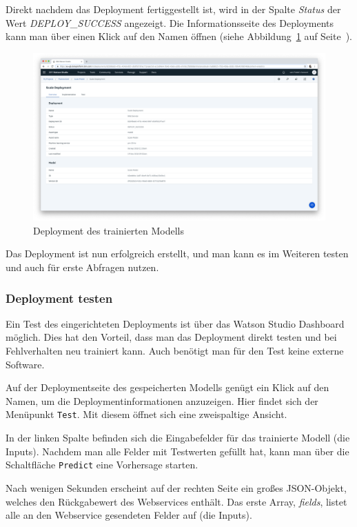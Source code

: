 Direkt nachdem das Deployment fertiggestellt ist, wird in der Spalte \textit{Status} der Wert \textit{DEPLOY\_SUCCESS}
angezeigt. Die Informationsseite des Deployments kann man über einen Klick auf den Namen öffnen
(siehe Abbildung~\ref{fig:umsetzung_deployment} auf Seite~\pageref{fig:umsetzung_deployment}).

\begin{figure}[h]
    \centering
    \includegraphics[width=\textwidth]{images/kapitel_3/umsetzung_deployment_model.png}
    \caption{Deployment des trainierten Modells}
    \label{fig:umsetzung_deployment}
\end{figure}

Das Deployment ist nun erfolgreich erstellt, und man kann es im Weiteren testen und auch für erste Abfragen nutzen.

\subsubsection{Deployment testen}
Ein Test des eingerichteten Deployments ist über das Watson Studio Dashboard möglich. Dies hat den Vorteil, dass man das
Deployment direkt testen und bei Fehlverhalten neu trainiert kann. Auch benötigt man für den Test keine externe Software.

Auf der Deploymentseite des gespeicherten Modells genügt ein Klick auf den Namen, um die Deploymentinformationen
anzuzeigen. Hier findet sich der Menüpunkt \texttt{Test}. Mit diesem öffnet sich eine zweispaltige Ansicht.

In der linken Spalte befinden sich die Eingabefelder für das trainierte Modell (die Inputs). Nachdem man alle Felder mit
Testwerten gefüllt hat, kann man über die Schaltfläche \texttt{Predict} eine Vorhersage starten.

Nach wenigen Sekunden erscheint auf der rechten Seite ein großes JSON-Objekt, welches den Rückgabewert des Webservices
enthält. Das erste Array, \textit{fields}, listet alle an den Webservice gesendeten Felder auf (die Inputs).


